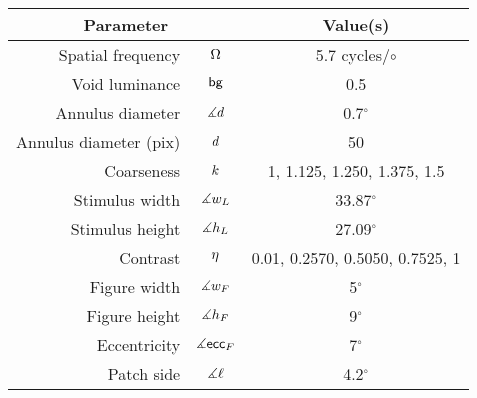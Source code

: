\begin{tabular}{rcc}
\hline
\multicolumn{2}{c}{\textbf{Parameter}} & \textbf{Value(s)} 
\\ \hline
{  Spatial frequency}        & ${\Omega}$       & 5.7 cycles/$\circ$ 
\\ 
{  Void luminance}           & ${\mathsf{bg}}$           & 0.5   
\\ 
{  Annulus diameter}         & ${\measuredangle d}$         & 0.7$^\circ$ 
\\ 
{  Annulus diameter (pix)}   & ${d}$           & 50  
\\ 
{  Coarseness}               & ${k}$   & 1, 1.125, 1.250, 1.375, 1.5 
\\
{  Stimulus width}           & ${\measuredangle w_L}$    & 33.87$^\circ$
\\
{  Stimulus height}          & ${\measuredangle h_L}$   & 27.09$^\circ$     
\\
{  Contrast}                 & ${\eta}$      & 0.01, 0.2570, 0.5050, 0.7525, 1   
\\
{  Figure width}             & ${\measuredangle w_F}$     & 5$^\circ$ %
\\
{  Figure height}            & ${\measuredangle h_F}$    & 9$^\circ$ %
\\
{  Eccentricity}             & ${\measuredangle \mathsf{ecc}_F}$       & 7$^\circ$ %
\\
{  Patch side} &             ${\measuredangle \ell}$    & 4.2$^\circ$ %
\\ \hline
\end{tabular}